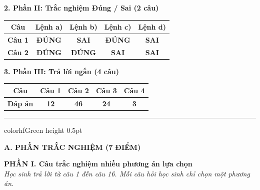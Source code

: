 \documentclass[11pt,a4paper]{article}
\begin{document}
\vspace{2pt}
\noindent
\textbf{\color{mainGreen}2. Phần II: Trắc nghiệm Đúng / Sai (2 câu)}
\begin{center}
\renewcommand{\arraystretch}{1.2}
\begin{tabular}{|c|c|c|c|c|}
\hline
\rowcolor{tableGreen}
\textbf{Câu} & \textbf{Lệnh a)} & \textbf{Lệnh b)} & \textbf{Lệnh c)} & \textbf{Lệnh d)} \\
\hline
\textbf{Câu 1} & \textbf{\color{hfRed}ĐÚNG} & \textbf{\color{solBlue}SAI} & \textbf{\color{hfRed}ĐÚNG} & \textbf{\color{solBlue}SAI} \\
\hline
\textbf{Câu 2} & \textbf{\color{hfRed}ĐÚNG} & \textbf{\color{hfRed}ĐÚNG} & \textbf{\color{solBlue}SAI} & \textbf{\color{solBlue}SAI} \\
\hline
\end{tabular}
\end{center}

\vspace{2pt}
\noindent
\textbf{\color{mainGreen}3. Phần III: Trả lời ngắn (4 câu)}
\begin{center}
\renewcommand{\arraystretch}{1.2}
\begin{tabular}{|c|c|c|c|c|}
\hline
\rowcolor{tableGreen}
\textbf{Câu} & \textbf{Câu 1} & \textbf{Câu 2} & \textbf{Câu 3} & \textbf{Câu 4} \\
\hline
\textbf{Đáp án} & \textbf{\color{hfRed}12} & \textbf{\color{hfRed}46} & \textbf{\color{hfRed}24} & \textbf{\color{hfRed}3} \\
\hline
\end{tabular}
\end{center}

\vspace{4pt}
\hrule color{hfGreen} height 0.5pt

\vspace{4pt}
\noindent
{\color{mainGreen}\textbf{\Large A. PHẦN TRẮC NGHIỆM (7 ĐIỂM)}}

\vspace{3pt}
\noindent
{\color{mainGreen}\textbf{\large PHẦN I. Câu trắc nghiệm nhiều phương án lựa chọn}}\\
\textit{\small Học sinh trả lời từ câu 1 đến câu 16. Mỗi câu hỏi học sinh chỉ chọn một phương án.}
\vspace{2pt}
\end{document}
